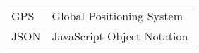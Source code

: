 \begin{table}[H]
\centering
\label{my-label}
\begin{tabular}{ll}
GPS                      & Global Positioning System                      \\
\multicolumn{1}{c}{JSON} & \multicolumn{1}{c}{JavaScript Object Notation}
\end{tabular}
\end{table}